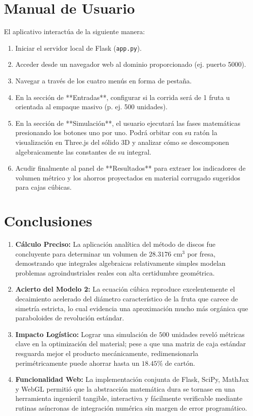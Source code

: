 \documentclass[conference, Spanish]{IEEEtran}
\begin{document}
\section{Manual de Usuario}
El aplicativo interactúa de la siguiente manera:
\begin{enumerate}
    \item Iniciar el servidor local de Flask (\texttt{app.py}).
    \item Acceder desde un navegador web al dominio proporcionado (ej. puerto 5000).
    \item Navegar a través de los cuatro menús en forma de pestaña.
    \item En la sección de **Entradas**, configurar si la corrida será de 1 fruta u orientada al empaque masivo (p. ej. 500 unidades).
    \item En la sección de **Simulación**, el usuario ejecutará las fases matemáticas presionando los botones uno por uno. Podrá orbitar con su ratón la visualización en Three.js del sólido 3D y analizar cómo se descomponen algebraicamente las constantes de su integral.
    \item Acudir finalmente al panel de **Resultados** para extraer los indicadores de volumen métrico y los ahorros proyectados en material corrugado sugeridos para cajas cúbicas.
\end{enumerate}

\section{Conclusiones}
\begin{enumerate}
    \item \textbf{Cálculo Preciso:} La aplicación analítica del método de discos fue concluyente para determinar un volumen de $28.3176$ cm$^3$ por fresa, demostrando que integrales algebraicas relativamente simples modelan problemas agroindustriales reales con alta certidumbre geométrica.
    \item \textbf{Acierto del Modelo 2:} La ecuación cúbica reproduce excelentemente el decaimiento acelerado del diámetro característico de la fruta que carece de simetría estricta, lo cual evidencia una aproximación mucho más orgánica que paraboloides de revolución estándar.
    \item \textbf{Impacto Logístico:} Lograr una simulación de $500$ unidades reveló métricas clave en la optimización del material; pese a que una matriz de caja estándar resguarda mejor el producto mecánicamente, redimensionarla perimétricamente puede ahorrar hasta un $18.45\%$ de cartón.
    \item \textbf{Funcionalidad Web:} La implementación conjunta de Flask, SciPy, MathJax y WebGL permitió que la abstracción matemática dura se tornase en una herramienta ingenieril tangible, interactiva y fácilmente verificable mediante rutinas asíncronas de integración numérica sin margen de error programático.
\end{enumerate}
\end{document}
